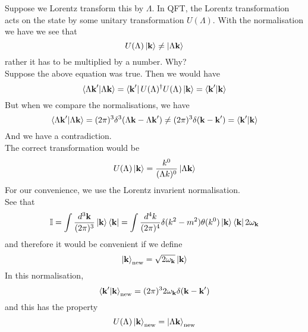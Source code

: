 \documentclass[11pt]{article}
\newcommand{\w}{\omega}
\numberwithin{equation}{section}
\begin{document}
    Suppose we Lorentz transform this by \(\Lambda\). In QFT, the Lorentz transformation acts on the state by some unitary transformation \(U(\Lambda)\). With the normalisation we have we see that 
    \begin{equation*}
        U(\Lambda) \ket{\textbf{k}} \ne \ket{\Lambda \textbf{k}}
    \end{equation*}
    rather it has to be multiplied by a number. Why?\\
    Suppose the above equation was true. Then we would have 
    \begin{equation*}
        \braket{\Lambda \textbf{k}'|\Lambda \textbf{k}} = \bra{\textbf{k}'} U(\Lambda)^\dagger U(\Lambda)\ket{\textbf{k}} = \braket{\textbf{k}'|\textbf{k}}
    \end{equation*}
    But when we compare the normalisations, we have 
    \begin{equation*}
        \braket{\Lambda \textbf{k}'|\Lambda \textbf{k}} = (2\pi)^3 \delta^3(\Lambda \textbf{k} - \Lambda \textbf{k}') \ne (2\pi)^3\delta(\textbf{k} - \textbf{k}') = \braket{\textbf{k}'|\textbf{k}}
    \end{equation*}
    And we have a contradiction.\\
    The correct transformation would be 
    \begin{equation*}
        U(\Lambda) \ket{\textbf{k}} = \frac{k^0}{(\Lambda k)^0}\ket{\Lambda \textbf{k}}
    \end{equation*}
    For our convenience, we use the Lorentz invarient normalisation. \\
    See that 
    \begin{equation*}
        \mathbb{I} = \int \frac{d^3\textbf{k}}{(2\pi)^3} \ket{\textbf{k}}\bra{\textbf{k}} = \int \frac{d^4k}{(2\pi)^4} \delta(k^2 - m^2)\theta(k^0)\ket{\textbf{k}}\bra{\textbf{k}}2\w_\textbf{k}
    \end{equation*}
    and therefore it would be convenient if we define 
    \begin{equation*}
        \ket{\textbf{k}}_{\text{new}} = \sqrt{2\w_\textbf{k}}\ket{\textbf{k}}
    \end{equation*}
    In this normalisation, 
    \begin{equation*}
        \braket{\textbf{k}'|\textbf{k}}_{\text{new}} = (2\pi)^3 2\w_\textbf{k}\delta(\textbf{k} - \textbf{k}')
    \end{equation*}
    and this has the property 
    \begin{equation*}
        U(\Lambda)\ket{\textbf{k}}_{\text{new}} = \ket{\Lambda \textbf{k}}_{\text{new}}
    \end{equation*}
\end{document}
